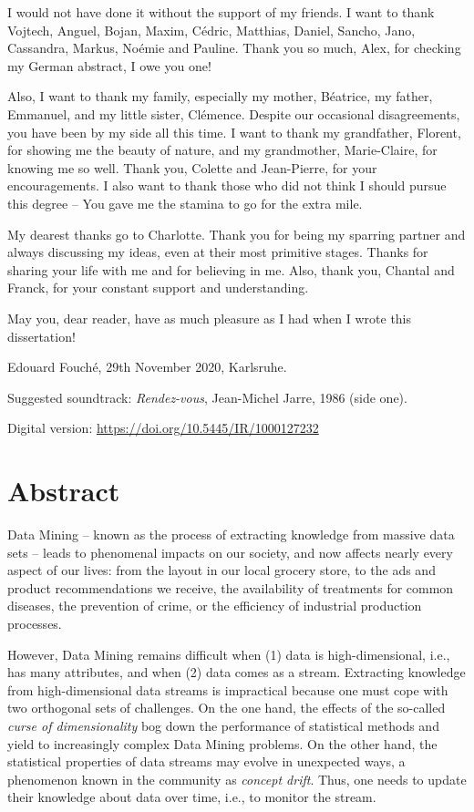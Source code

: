 \documentclass[smalldiss]{sdqdiss-a4}
\newcommand{\Abstract}[1][Abstract]{\chapter*{#1}\addcontentsline{toc}{chapter}{#1}\markboth{#1}{#1}}
\begin{document}
I would not have done it without the support of my friends. I want to thank Vojtech, Anguel, Bojan, Maxim, Cédric, Matthias, Daniel, Sancho, Jano, Cassandra, Markus, Noémie and Pauline. Thank you so much, Alex, for checking my German abstract, I owe you one! 

Also, I want to thank my family, especially my mother, Béatrice, my father, Emmanuel, and my little sister, Clémence. Despite our occasional disagreements, you have been by my side all this time. I want to thank my grandfather, Florent, for showing me the beauty of nature, and my grandmother, Marie-Claire, for knowing me so well. Thank you, Colette and Jean-Pierre, for your encouragements. I also want to thank those who did not think I should pursue this degree -- You gave me the stamina to go for the extra mile. 

My dearest thanks go to Charlotte. Thank you for being my sparring partner and always discussing my ideas, even at their most primitive stages. Thanks for sharing your life with me and for believing in me. Also, thank you, Chantal and Franck, for your constant support and understanding. 

May you, dear reader, have as much pleasure as I had when I wrote this dissertation!

\bigskip\bigskip\noindent
Edouard Fouché, 29th November 2020, Karlsruhe. 

\bigskip\bigskip\noindent
Suggested soundtrack: \textit{Rendez-vous}, Jean-Michel Jarre, 1986 (side one).

\bigskip\noindent 
Digital version: \url{https://doi.org/10.5445/IR/1000127232}
%
\Abstract{}

Data Mining -- known as the process of extracting knowledge from massive data sets -- leads to phenomenal impacts on our society, and now affects nearly every aspect of our lives: from the layout in our local grocery store, to the ads and product recommendations we receive, the availability of treatments for common diseases, the prevention of crime, or the efficiency of industrial production processes. 

However, Data Mining remains difficult when (1) data is high-dimensional, i.e., has many attributes, and when (2) data comes as a stream. Extracting knowledge from high-dimensional data streams is impractical because one must cope with two orthogonal sets of challenges. On the one hand, the effects of the so-called \textit{curse of dimensionality} bog down the performance of statistical methods and yield to increasingly complex Data Mining problems. On the other hand, the statistical properties of data streams may evolve in unexpected ways, a phenomenon known in the community as \textit{concept drift}. Thus, one needs to update their knowledge about data over time, i.e., to monitor the stream. 
\end{document}
